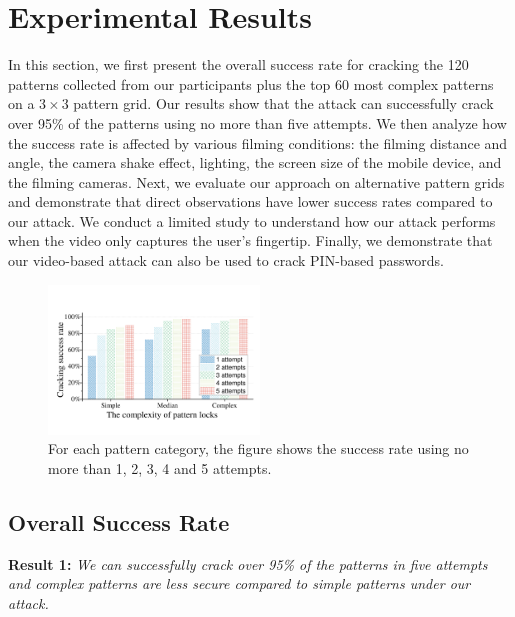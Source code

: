 \section{Experimental Results}
    In this section, we first present the overall success rate for cracking
    the 120 patterns collected from our participants plus the top 60 most complex patterns
    on a $3\times3$ pattern grid.
    Our results show that the attack can successfully crack over 95\% of the
    patterns using no more than five attempts. We then analyze how the
     success rate is affected by various filming conditions: the filming distance and angle,
    the camera shake effect, lighting, the screen size of the mobile device, and the filming cameras. Next, we evaluate our approach on alternative pattern grids and demonstrate that direct observations have lower success rates compared to our attack.
    We conduct a limited study to understand how our attack performs when the video only captures the user's fingertip.
     Finally, we demonstrate that our video-based attack can also be used to crack PIN-based passwords. 
     
\begin{figure}[!t]
    \centering
    \includegraphics[width=0.5\textwidth]{fig/10.pdf}
    \caption{For each pattern category, the figure shows the success rate using no more than 1, 2, 3, 4 and 5 attempts.}
    \label{fig:fig10}
\end{figure}

    \subsection{Overall Success Rate \label{sec:overall_rate}}

    \noindent \textbf{Result 1:}  \emph{We can successfully crack over 95\% of the patterns in five attempts and complex patterns are less secure compared to simple patterns under our attack.}

